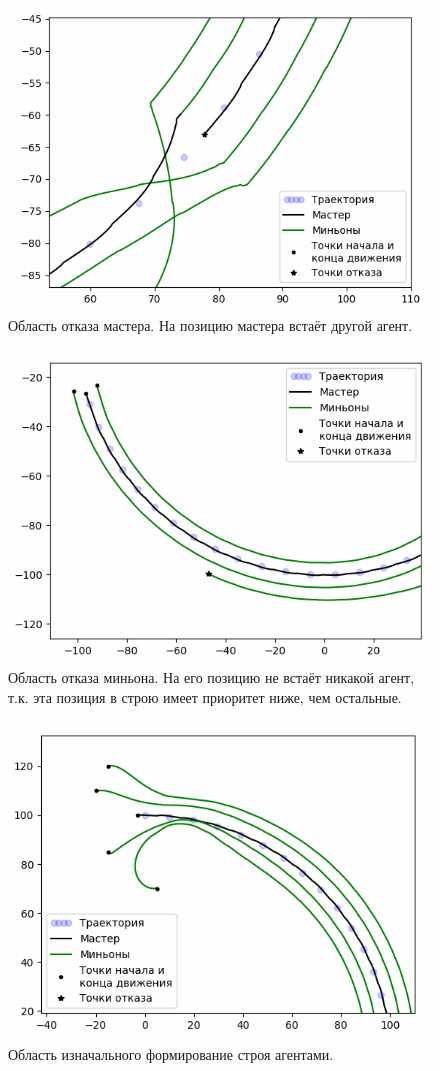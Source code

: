 \documentclass[a4paper, 14pt]{extarticle}
\begin{document}
\begin{figure}
	\centering
	\includegraphics[width=0.7\linewidth]{platoon/with-crashes-zoom3}
	\caption{Область отказа мастера. На позицию мастера встаёт другой агент.}
	\label{fig:with-crashes-zoom3}
\end{figure}
\begin{figure}
	\centering
	\includegraphics[width=0.7\linewidth]{platoon/with-crashes-zoom1}
	\caption{Область отказа миньона. На его позицию не встаёт никакой агент, т.к. эта позиция в строю имеет приоритет ниже, чем остальные.}
	\label{fig:with-crashes-zoom1}
\end{figure}
\begin{figure}
	\centering
	\includegraphics[width=0.7\linewidth]{platoon/with-crashes-zoom2}
	\caption{Область изначального формирование строя агентами.}
	\label{fig:with-crashes-zoom2}
\end{figure}
\end{document}
